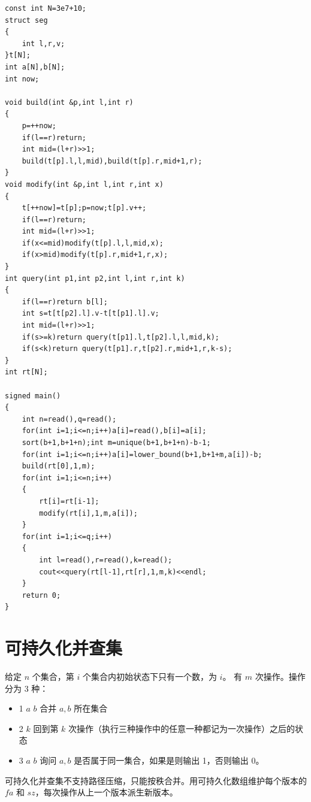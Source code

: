 \begin{verbatim}
const int N=3e7+10;
struct seg
{
    int l,r,v;
}t[N];
int a[N],b[N];
int now;

void build(int &p,int l,int r)
{
    p=++now;
    if(l==r)return;
    int mid=(l+r)>>1;
    build(t[p].l,l,mid),build(t[p].r,mid+1,r);
}
void modify(int &p,int l,int r,int x)
{
    t[++now]=t[p];p=now;t[p].v++;
    if(l==r)return; 
    int mid=(l+r)>>1;
    if(x<=mid)modify(t[p].l,l,mid,x);
    if(x>mid)modify(t[p].r,mid+1,r,x);
}
int query(int p1,int p2,int l,int r,int k)
{
    if(l==r)return b[l];
    int s=t[t[p2].l].v-t[t[p1].l].v;
    int mid=(l+r)>>1;
    if(s>=k)return query(t[p1].l,t[p2].l,l,mid,k);
    if(s<k)return query(t[p1].r,t[p2].r,mid+1,r,k-s);
}
int rt[N];

signed main()
{
    int n=read(),q=read();
    for(int i=1;i<=n;i++)a[i]=read(),b[i]=a[i];
    sort(b+1,b+1+n);int m=unique(b+1,b+1+n)-b-1;
    for(int i=1;i<=n;i++)a[i]=lower_bound(b+1,b+1+m,a[i])-b;
    build(rt[0],1,m);
    for(int i=1;i<=n;i++)
    {
        rt[i]=rt[i-1];
        modify(rt[i],1,m,a[i]);
    }
    for(int i=1;i<=q;i++)
    {
        int l=read(),r=read(),k=read();
        cout<<query(rt[l-1],rt[r],1,m,k)<<endl;
    }
    return 0;
}
\end{verbatim}

\section{可持久化并查集}
\begin{tcolorbox}
给定 $n$ 个集合，第 $i$ 个集合内初始状态下只有一个数，为 $i$。
有 $m$ 次操作。操作分为 3 种：
\begin{itemize}
\item 1 $a$ $b$ 合并 $a,b$ 所在集合
\item 2 $k$ 回到第 $k$ 次操作（执行三种操作中的任意一种都记为一次操作）之后的状态
\item 3 $a$ $b$ 询问 $a,b$ 是否属于同一集合，如果是则输出 1，否则输出 0。
\end{itemize}
\end{tcolorbox}

\par \noindent 可持久化并查集不支持路径压缩，只能按秩合并。用可持久化数组维护每个版本的 $fa$ 和 $sz$，每次操作从上一个版本派生新版本。

